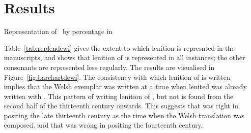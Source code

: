 \begin{mwl}
\end{mwl}


\section{Results}
\label{sec:results-1}

\begin{table}[h]
  \centering
  \caption{Representation of \lT\ by percentage in }
  \label{tab:replendewi}
  
\end{table}

Table~\ref{tab:replendewi} gives the extent to which lenition is represnted in the manuscripts, and shows that lenition of  is represented in all instances; the other consonants are represented less regularly. The results are visualised in Figure~\ref{fig:barchartdewi}. The consistency with which lenition of  is written implies that the Welsh exemplar was written at a time when lenited  was already written with . This pattern of writing lenition of , but not  is found from the second half of the thirteenth century onwards. This suggests that \textcite{Rob_Ystoriaeu11} was right in positing the late thirteenth century as the time when the Welsh translation was composed, and that \textcite{Eva_Welsh88} was wrong in positing the fourteenth century.

%   

